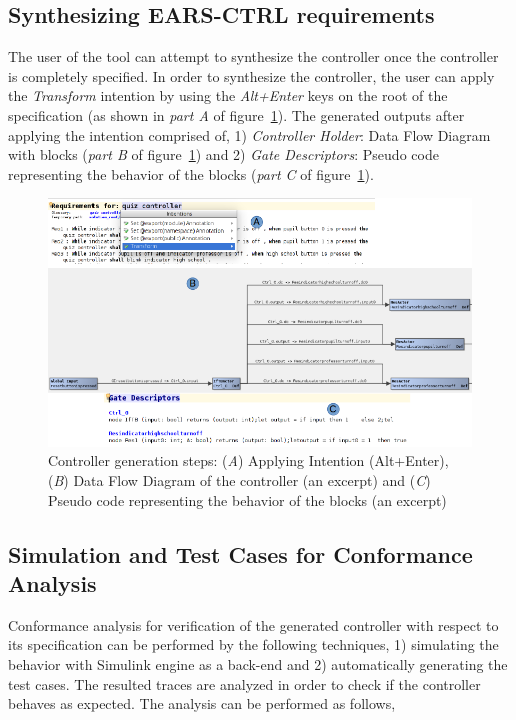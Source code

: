 \subsection{Synthesizing \textsf{EARS-CTRL} requirements}
\vspace{-.2cm}
The user of the tool can attempt to synthesize the controller
once the  controller is completely specified. In order to
synthesize the controller, the user can apply the \emph{Transform} intention by using the
\emph{Alt+Enter} keys on the root of the specification (as shown in \emph{part
A} of figure~\ref{fig:Spec_transform}). The generated outputs after applying the
intention comprised of, 1) \emph{Controller Holder}: Data Flow
Diagram with blocks  (\emph{part B} of
figure~\ref{fig:Spec_transform}) and 2) \emph{Gate Descriptors}:
Pseudo code representing the behavior of the blocks (\emph{part C} of
figure~\ref{fig:Spec_transform}).
\begin{figure}[!h]
\centering
\includegraphics[width=1\textwidth]{./images/Transform.png}
\caption{Controller generation steps: (\emph{A}) Applying Intention (Alt+Enter),
(\emph{B}) Data Flow Diagram of the controller (an excerpt) and (\emph{C})
Pseudo code representing the behavior of the blocks (an excerpt)}
\label{fig:Spec_transform}
\end{figure}
\vspace{-.5cm}
\subsection{Simulation and Test Cases for Conformance Analysis}
\vspace{-.2cm}
Conformance analysis for verification of the generated controller with respect
to its specification  can be performed by the following techniques, 1) simulating the
behavior with Simulink engine \cite{MatlabSimulink} as a back-end and 2) automatically generating the test cases.
The resulted traces are analyzed in order to check if the controller behaves as
expected. The analysis can be
performed as follows,
